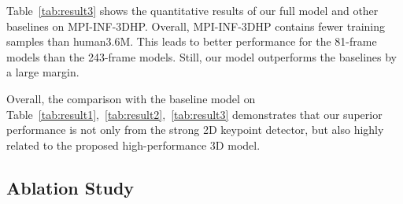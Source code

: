 \documentclass[journal]{IEEEtran}
\begin{document}
Table~\ref{tab:result3} shows the quantitative results of our full model and other baselines on MPI-INF-3DHP. Overall, MPI-INF-3DHP contains fewer training samples than human3.6M. This leads to better performance for the 81-frame models than the 243-frame models. Still, our model outperforms the baselines by a large margin. 

Overall, the comparison with the baseline model \cite{pavllo20193d} on Table~\ref{tab:result1},~\ref{tab:result2},~\ref{tab:result3} demonstrates that our superior performance is not only from the strong 2D keypoint detector, but also highly related to the proposed high-performance 3D model.





 
 
 \begin{table}[htbp]
  \small\centering
  \caption{\label{tab:result3} Quantitative comparisons of different models on MPI-INF-3DHP. }
  \begin{threeparttable}
  \end{threeparttable}
  
  \vspace{-1mm}
\end{table}\vspace{-1mm}


\subsection{Ablation Study} \label{sec:abl}
\end{document}
